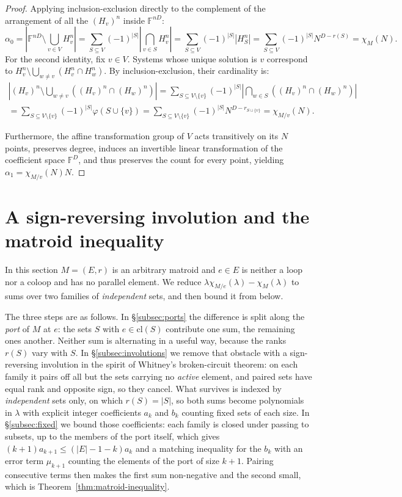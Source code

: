\documentclass[11pt,a4paper]{article}
\theoremstyle{definition}
\newcommand{\cl}{\mathrm{cl}}
\begin{document}
\begin{proof}
Applying inclusion-exclusion directly to the complement of the arrangement of all the $(H_v)^n$ inside $\mathbb{F}^{nD}$:
\[
\alpha_0 = \left| \mathbb{F}^{nD} \setminus \bigcup_{v \in V} H_v^n \right| = \sum_{S \subseteq V} (-1)^{|S|} \left| \bigcap_{v \in S} H_v^n \right| = \sum_{S \subseteq V} (-1)^{|S|} |H_S^n| = \sum_{S \subseteq V} (-1)^{|S|} N^{D - r(S)} = \chi_M(N).
\]
For the second identity, fix $v \in V$. Systems whose unique solution is $v$ correspond to $H_v^n \setminus \bigcup_{w \neq v} (H_v^n \cap H_w^n)$. By inclusion-exclusion, their cardinality is:
\begin{align*}
    \left| (H_v)^n \setminus \bigcup_{w \neq v} ((H_v)^n \cap (H_w)^n)  \right| = \sum_{S \subseteq V \setminus \{v\}} (-1)^{|S|} \left| \bigcap_{w \in S} ((H_v)^n \cap (H_w)^n) \right|  \\ =  \sum_{S \subseteq V \setminus \{v\}} (-1)^{|S|} \varphi(S \cup \{v\}) = \sum_{S \subseteq V \setminus \{v\}} (-1)^{|S|}N^{D - r_{S \cup \{v\}}} = \chi_{M/v}(N). 
\end{align*}

Furthermore, the affine transformation group of $V$ acts transitively on its $N$ points, preserves degree, induces an invertible linear transformation of the coefficient space $\mathbb{F}^D$, and thus preserves the count for every point, yielding $\alpha_1 =  \chi_{M/v}(N)N$.
\end{proof}

\section{A sign-reversing involution and the matroid inequality} \label{sec:reduction}

In this section $M=(E,r)$ is an arbitrary matroid and $e\in E$ is neither a loop nor a coloop and has no parallel element. We reduce $\lambda\chi_{M/e}(\lambda)-\chi_M(\lambda)$ to sums over two families of \emph{independent} sets, and then bound it from below.

The three steps are as follows. In \S\ref{subsec:ports} the difference is split
along the \emph{port} of $M$ at $e$: the sets $S$ with $e\in\cl(S)$ contribute one
sum, the remaining ones another. Neither sum is alternating in a useful way, because
the ranks $r(S)$ vary with $S$. In \S\ref{subsec:involutions} we remove that
obstacle with a sign-reversing involution in the spirit of Whitney's
broken-circuit theorem: on each family it pairs off all but the sets carrying no
\emph{active} element, and paired sets have equal rank and opposite sign, so they
cancel. What survives is indexed by \emph{independent} sets only, on which
$r(S)=|S|$, so both sums become polynomials in $\lambda$ with explicit integer
coefficients $a_k$ and $b_k$ counting fixed sets of each size. In
\S\ref{subsec:fixed} we bound those coefficients: each family is closed under
passing to subsets, up to the members of the port itself, which gives
$(k+1)a_{k+1}\le(|E|-1-k)a_k$ and a matching inequality for the $b_k$ with an error
term $\mu_{k+1}$ counting the elements of the port of size $k+1$. Pairing consecutive terms then makes the
first sum non-negative and the second small, which is
Theorem~\ref{thm:matroid-inequality}.
\end{document}
